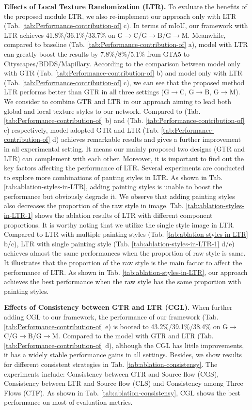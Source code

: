 \documentclass[twocolumn,journal,vlined,ruled,linesnumbered]{IEEEtran}
\begin{document}
\textbf{Effects of Local Texture Randomization (LTR).} To evaluate the benefits of the proposed module LTR, we also re-implement our approach only with LTR (Tab. \ref{tab:Performance-contribution-of} c). In terms of mIoU, our framework with LTR achieves 41.8\%/36.1\%/33.7\% on G$\rightarrow$C/G$\rightarrow$B/G$\rightarrow$M. Meanwhile,
compared to baseline (Tab. \ref{tab:Performance-contribution-of} a), model with LTR can greatly boost the results by 7.8\%/8\%/5.1\% from GTA5 to Cityscapes/BDDS/Mapillary. According to the comparison between model only with GTR (Tab. \ref{tab:Performance-contribution-of} b) and model only with LTR (Tab. \ref{tab:Performance-contribution-of} c), we can see that the proposed method LTR performs better than GTR in all three settings (G$\rightarrow$C, G$\rightarrow$B, G$\rightarrow$M). We consider to combine GTR and LTR in our approach aiming to lead both global and local texture styles to our network. Compared to (Tab. \ref{tab:Performance-contribution-of} b) and (Tab. \ref{tab:Performance-contribution-of} c) respectively, model adopted GTR and LTR (Tab. \ref{tab:Performance-contribution-of} d) achieves remarkable results and gives a further improvement in all experimental setting. It means our mainly proposed two designs (GTR and LTR) can complement with each other. Moreover, it is important to find out the key factors affecting the performance of LTR. Several experiments are conducted to explore more combinations of panting styles in LTR. As shown in Tab. \ref{tab:ablation-styles-in-LTR}, adding painting styles is unable to boost the performance but obviously degrade it. We observe that adding painting styles also decreases the proportion of the raw style in image. Tab. \ref{tab:ablation-styles-in-LTR-1} shows the ablation results of LTR with different component proportions. It is worthy noting that we utilize the single style image in LTR. Compared to LTR with multiple painting styles (Tab. \ref{tab:ablation-styles-in-LTR} b/c), LTR with single painting style (Tab. \ref{tab:ablation-styles-in-LTR-1} d/e) achieves almost the same performances when the proportion of raw style is same. It illustrates that the proportion of the raw style is the main factor to affect the performance of LTR. As shown in Tab. \ref{tab:ablation-styles-in-LTR}, our approach achieves the best performance when the raw style has the same proportion with painting styles.

\textbf{Effects of Consistency between GTR and LTR (CGL).} When further adding CGL to our framework, the performance of our framework (Tab. \ref{tab:Performance-contribution-of} e) is booted to 43.2\%/39.1\%/38.4\% on G$\rightarrow$C/G$\rightarrow$B/G$\rightarrow$M. Compared to the model with GTR and LTR (Tab. \ref{tab:Performance-contribution-of} d), although the CGL has little improvements, it has a widely stable performance gains in all settings. Besides, we show results for different consistent strategies in Tab. \ref{tab:ablation-consistensy}. The experiments include: Consistency between GTR and Source flow (CGS), Consistency between LTR and Source flow (CLS) and Consistency among Three Flows (CTF). As shown in Tab. \ref{tab:ablation-consistensy}, CGL shows the best performance on most of evaluation metrics.
\end{document}
